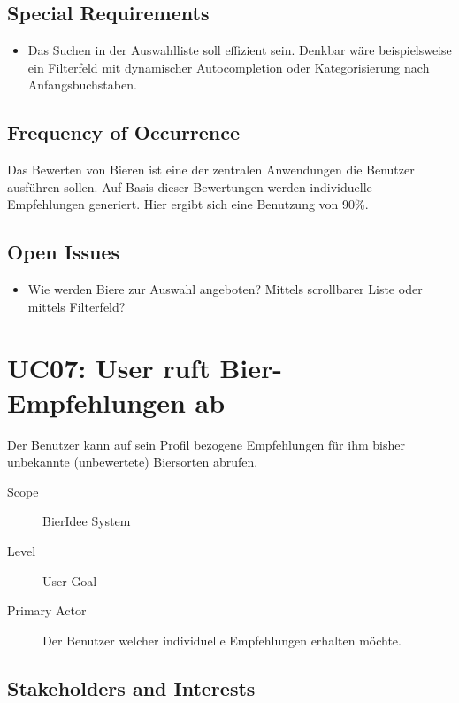 \documentclass[10pt,a4paper]{scrartcl}
\begin{document}
\subsection*{Special Requirements}

\begin{itemize}
\item Das Suchen in der Auswahlliste soll effizient sein. Denkbar wäre beispielsweise ein Filterfeld mit dynamischer Autocompletion oder Kategorisierung nach Anfangsbuchstaben.
\end{itemize}


\subsection*{Frequency of Occurrence}

Das Bewerten von Bieren ist eine der zentralen Anwendungen die Benutzer ausführen sollen.
Auf Basis dieser Bewertungen werden individuelle Empfehlungen generiert. Hier ergibt sich eine Benutzung von 90\%.

\subsection*{Open Issues}

\begin{itemize}
\item Wie werden Biere zur Auswahl angeboten? Mittels scrollbarer Liste oder mittels Filterfeld?
\end{itemize}



\section*{UC07: User ruft Bier-Empfehlungen ab}
Der Benutzer kann auf sein Profil bezogene Empfehlungen für ihm bisher unbekannte (unbewertete) Biersorten abrufen.

\begin{description}
\item[Scope] BierIdee System
\item[Level] User Goal
\item[Primary Actor] Der Benutzer welcher individuelle Empfehlungen erhalten möchte.
\end{description}


\subsection*{Stakeholders and Interests}
\end{document}
